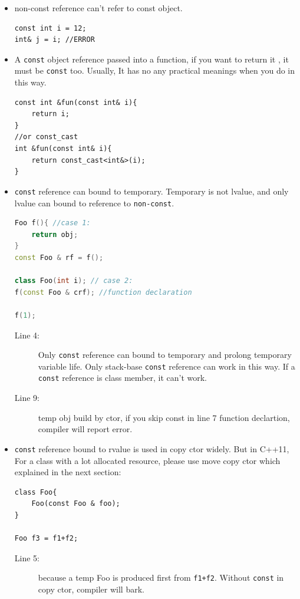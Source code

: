 \documentclass[a4paper,11pt,twoside]{book}
\begin{document}
\begin{itemize}
\item non-const reference can't refer to const object.
\begin{lstlisting}[numbers=none]
const int i = 12;
int& j = i; //ERROR
\end{lstlisting}

\item A \texttt{const} object reference passed into a function, if you want to return it , it must be \texttt{const} too. Usually, It has no any practical meanings when you do in this way. 
\begin{lstlisting}[numbers=none]
const int &fun(const int& i){ 
	return i;
}
//or const_cast 
int &fun(const int& i){ 
	return const_cast<int&>(i);
}
\end{lstlisting}

\item  \texttt{const} reference can bound to temporary. Temporary is not lvalue, and only lvalue can bound to reference to \texttt{non-const}.   
\begin{lstlisting}[frame=single, language=c++]
Foo f(){ //case 1:
	return obj;
}
const Foo & rf = f();

class Foo(int i); // case 2:
f(const Foo & crf); //function declaration

f(1);
\end{lstlisting}
\begin{description}
	\item[Line 4:] Only \texttt{const} reference can bound to temporary and prolong temporary variable life. Only stack-base \texttt{const} reference can work in this way. If a \texttt{const} reference is class member, it can't work. 
	
	\item[Line 9:] temp obj build by ctor, if you skip const in line 7 function declartion, compiler will report error.
\end{description}

	\item \texttt{const} reference bound to rvalue is used in copy ctor widely. But in C++11, For a class with a lot allocated resource, please use move copy ctor which explained in the next section:

\begin{lstlisting}[numbers=none]
class Foo{
	Foo(const Foo & foo);
}

Foo f3 = f1+f2;
\end{lstlisting}
\begin{description}
	\item[Line 5:] because a temp Foo is produced first from \texttt{f1+f2}. Without \texttt{const} in copy ctor, compiler will bark.
\end{description}

\end{itemize}
\end{document}
